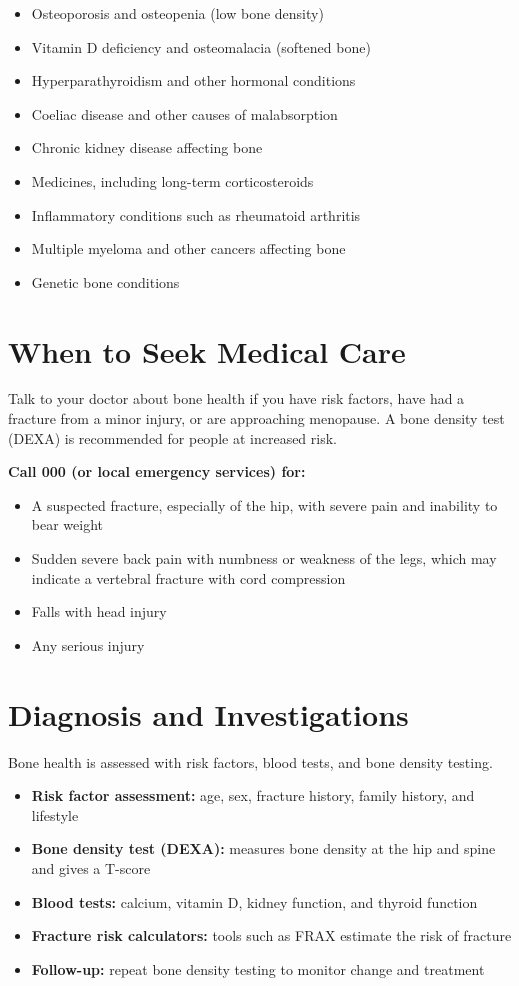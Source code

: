 \begin{itemize}
    \item Osteoporosis and osteopenia (low bone density)
    \item Vitamin D deficiency and osteomalacia (softened bone)
    \item Hyperparathyroidism and other hormonal conditions
    \item Coeliac disease and other causes of malabsorption
    \item Chronic kidney disease affecting bone
    \item Medicines, including long-term corticosteroids
    \item Inflammatory conditions such as rheumatoid arthritis
    \item Multiple myeloma and other cancers affecting bone
    \item Genetic bone conditions
\end{itemize}

\section*{When to Seek Medical Care}
Talk to your doctor about bone health if you have risk factors, have had a fracture from a minor injury, or are approaching menopause. A bone density test (DEXA) is recommended for people at increased risk.

\textbf{Call 000 (or local emergency services) for:}
\begin{itemize}
    \item A suspected fracture, especially of the hip, with severe pain and inability to bear weight
    \item Sudden severe back pain with numbness or weakness of the legs, which may indicate a vertebral fracture with cord compression
    \item Falls with head injury
    \item Any serious injury
\end{itemize}

\section*{Diagnosis and Investigations}
Bone health is assessed with risk factors, blood tests, and bone density testing.

\begin{itemize}
    \item \textbf{Risk factor assessment:} age, sex, fracture history, family history, and lifestyle
    \item \textbf{Bone density test (DEXA):} measures bone density at the hip and spine and gives a T-score
    \item \textbf{Blood tests:} calcium, vitamin D, kidney function, and thyroid function
    \item \textbf{Fracture risk calculators:} tools such as FRAX estimate the risk of fracture
    \item \textbf{Follow-up:} repeat bone density testing to monitor change and treatment
\end{itemize}

